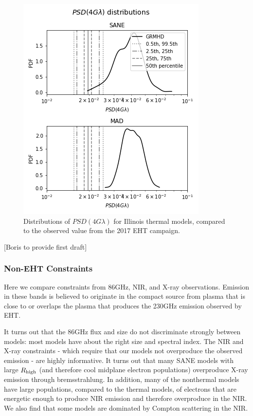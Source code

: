 \begin{figure}
  \centering
    \includegraphics[width=\columnwidth]{./figures/va_dist.png}
  \caption{Distributions of $PSD(4G\lambda)$ for Illinois thermal models, compared to the observed value from the 2017 EHT campaign. }
  \label{fig:cmp_VLBI_var}
\end{figure}

[Boris to provide first draft]

\subsubsection{Non-EHT Constraints}

Here we compare constraints from 86GHz, NIR, and X-ray observations.  Emission in these bands is believed to originate in the compact source from plasma that is close to or overlaps the plasma that produces the 230GHz emission observed by EHT.

It turns out that the 86GHz flux and size do not discriminate strongly between models: most models have about the right size and spectral index.  The NIR and X-ray constraints - which require that our models not overproduce the observed emission - are highly informative.  It turns out that many SANE models with large $R_\mathrm{high}$ (and therefore cool midplane electron populations) overproduce X-ray emission through bremsstrahlung.  In addition, many of the nonthermal models have large populations, compared to the thermal models, of electrons that are energetic enough to produce NIR emission and therefore overproduce in the NIR.   We also find that some models are dominated by Compton scattering in the NIR.


